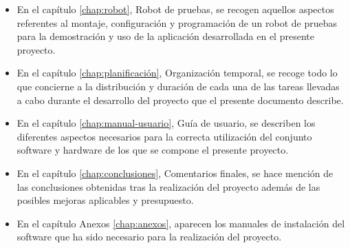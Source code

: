 \begin{itemize}
\item En el capítulo \ref{chap:robot}, Robot de pruebas, se recogen aquellos aspectos referentes al montaje, configuración y programación de un robot de pruebas para la demostración y uso de la aplicación desarrollada en el presente proyecto. 

\item En el capítulo \ref{chap:planificación}, Organización temporal, se recoge todo lo que concierne a la distribución y duración de cada una de las tareas llevadas a cabo durante el desarrollo del proyecto que el presente documento describe.

\item En el capítulo \ref{chap:manual-usuario}, Guía de usuario, se describen los diferentes aspectos necesarios para la correcta utilización del conjunto software y hardware de los que se compone el presente proyecto.

\item En el capítulo \ref{chap:conclusiones}, Comentarios finales, se hace mención de las conclusiones obtenidas tras la realización del proyecto además de las posibles mejoras aplicables y presupuesto.

\item En el capítulo Anexos \ref{chap:anexos}, aparecen los manuales de instalación del software que ha sido necesario para la realización del proyecto.

\end{itemize}
